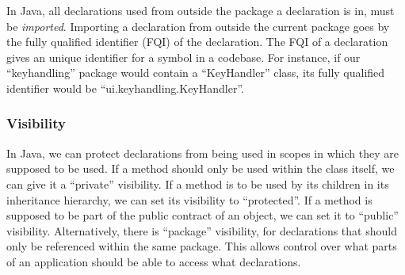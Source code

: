 In Java, all declarations used from outside the package a declaration is in, must be \textit{imported}. Importing a declaration from outside the current package goes by the fully qualified identifier (FQI) of the declaration. The FQI of a declaration gives an unique identifier for a symbol in a codebase. For instance, if our ``keyhandling'' package would contain a ``KeyHandler'' class, its fully qualified identifier would be ``ui.keyhandling.KeyHandler''.

\subsubsection{Visibility}
In Java, we can protect declarations from being used in scopes in which they are supposed to be used. If a method should only be used within the class itself, we can give it a ``private'' visibility. If a method is to be used by its children in its inheritance hierarchy, we can set its visibility to ``protected''. If a method is supposed to be part of the public contract of an object, we can set it to ``public'' visibility. Alternatively, there is ``package'' visibility, for declarations that should only be referenced within the same package. This allows control over what parts of an application should be able to access what declarations.
